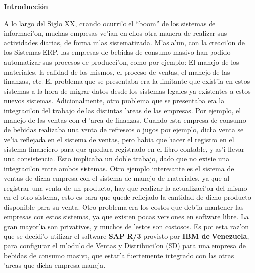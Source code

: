 
\begin{center}
	{\bf Introducci\'on} \label{chap:intro}
\end{center}

\label{sect:motivacion}

	A lo largo del Siglo XX, cuando ocurri'o el ``boom'' de los sistemas de informaci'on, muchas empresas ve'ian en ellos otra manera de realizar sus actividades diarias, de forma m'as sistematizada. M'as a'un, con la creaci'on de los Sistemas ERP, las empresas de bebidas de consumo masivo han podido automatizar sus procesos de producci'on, como por ejemplo: El manejo de los materiales, la calidad de los mismos, el proceso de ventas, el manejo de las finanzas, etc. El problema que se presentaba era la limitante que exist'ia en estos sistemas a la hora de migrar datos desde los sistemas legales ya existentes a estos nuevos sistemas.
\newline
\newline
	 Adicionalmente, otro problema que se presentaba era la integraci'on del trabajo de las distintas 'areas de las empresas. Por ejemplo, el manejo de las ventas con el 'area de finanzas. Cuando esta empresa de consumo de bebidas realizaba una venta de refrescos o jugos por ejemplo, dicha venta se ve'ia reflejada en el sistema de ventas, pero habia que hacer el registro en el sistema financiero para que quedara registrado en el libro contable, y as'i llevar una consistencia. Esto implicaba un doble trabajo, dado que no existe una integraci'on entre ambos sistemas. Otro ejemplo interesante es el sistema de ventas de dicha empresa con el sistema de manejo de materiales, ya que al registrar una venta de un producto, hay que realizar la actualizaci'on del mismo en el otro sistema, esto es para que quede reflejado la cantidad de dicho producto disponible para su venta.
\newline
\newline
	 Otro problema era los costos que deb'ia mantener las empresas con estos sistemas, ya que existen pocas versiones en software libre. La gran mayor'ia son privativos, y muchos de 'estos son costosos.
\newline
\newline
	 Es por esta raz'on que se decidi'o utilizar el software \textbf{SAP R/3} provisto por \textbf{IBM de Venezuela}, para configurar el m'odulo de Ventas y Distribuci'on (SD) para una empresa de bebidas de consumo masivo, que estar'a fuertemente integrado con las otras 'areas que dicha empresa maneja.
